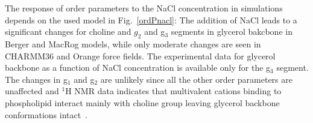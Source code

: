 \documentclass[pre,aps,floatfix,authordate1-4,twocolumn]{revtex4-1}
\begin{document}
The response of order parameters to the NaCl concentration in simulations depends on the used model in Fig.~\ref{ordPnacl}:
The addition of NaCl leads to a significant changes for choline and $g_2$ and g$_3$ segments in glycerol bakcbone
in Berger and MacRog models, while only moderate changes are seen in CHARMM36 and Orange force fields.
The experimental data for glycerol backbone as a function of NaCl concentration is available only for the
g$_3$ segment.  The changes in g$_1$ and g$_2$ are unlikely since all the other order parameters are unaffected
and $^1$H NMR data indicates that multivalent cations binding to phospholipid interact mainly with choline group
leaving glycerol backbone conformations intact~\cite{hauser76,hauser78}.



\end{document}
